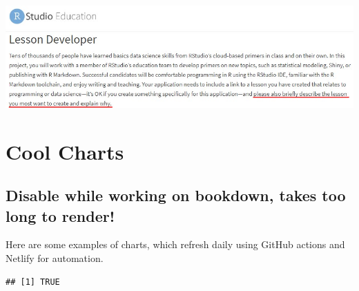 \documentclass[
]{book}
\begin{document}
\includegraphics{images/idealTutorial.png}

\hypertarget{cool-charts}{%
\chapter{Cool Charts}\label{cool-charts}}

\hypertarget{disable-while-working-on-bookdown-takes-too-long-to-render}{%
\section{Disable while working on bookdown, takes too long to render!}\label{disable-while-working-on-bookdown-takes-too-long-to-render}}

Here are some examples of charts, which refresh daily using GitHub actions and Netlify for automation.

\begin{verbatim}
## [1] TRUE
\end{verbatim}

  
\end{document}
